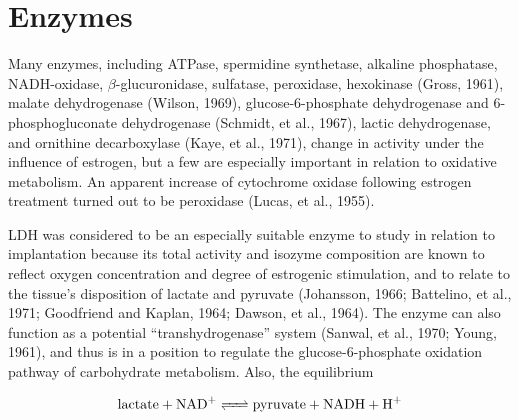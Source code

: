 \section{Enzymes}

Many enzymes, including ATPase, spermidine synthetase, alkaline phosphatase, NADH-oxidase, $\beta$-glucuronidase, sulfatase, peroxidase, hexokinase (Gross, 1961), malate dehydrogenase (Wilson, 1969), glucose-6-phosphate dehydrogenase and 6-phosphogluconate dehydrogenase (Schmidt, et al., 1967), lactic dehydrogenase, and ornithine decarboxylase (Kaye, et al., 1971), change in activity under the influence of estrogen, but a few are especially important in relation to oxidative metabolism. An apparent increase of cytochrome oxidase following estrogen treatment turned out to be peroxidase (Lucas, et al., 1955).

LDH was considered to be an especially suitable enzyme to study in relation to implantation because its total activity and isozyme composition are known to reflect oxygen concentration and degree of estrogenic stimulation, and to relate to the tissue's disposition of lactate and pyruvate (Johansson, 1966; Battelino, et al., 1971; Goodfriend and Kaplan, 1964; Dawson, et al., 1964). The enzyme can also function as a potential ``transhydrogenase'' system (Sanwal, et al., 1970; Young, 1961), and thus is in a position to regulate the glucose-6-phosphate oxidation pathway of carbohydrate metabolism. Also, the equilibrium

\[
  \ce{lactate + NAD+ <=> pyruvate + NADH + H+}
\]

